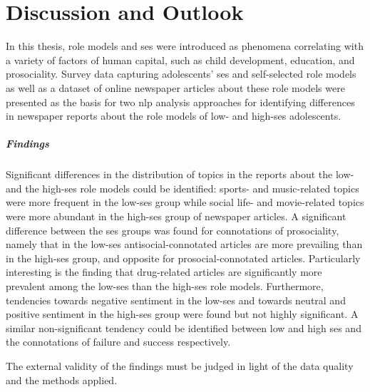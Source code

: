\renewcommand{\imagepath}{../80-outro/img}

\chapter{Discussion and Outlook}
In this thesis, role models and \gls{ses} were introduced as phenomena correlating with a variety of factors of human capital, such as child development, education, and prosociality. Survey data capturing adolescents' \gls{ses} and self-selected role models as well as a dataset of online newspaper articles about these role models were presented as the basis for two \gls{nlp} analysis approaches for identifying differences in newspaper reports about the role models of low- and high-\gls{ses} adolescents.

\paragraph{Findings}
Significant differences in the distribution of topics in the reports about the low- and the high-\gls{ses} role models could be identified: sports- and music-related topics were more frequent in the low-\gls{ses} group while social life- and movie-related topics were more abundant in the high-\gls{ses} group of newspaper articles. A significant difference between the \gls{ses} groups was found for connotations of prosociality, namely that in the low-\gls{ses} antisocial-connotated articles are more prevailing than in the high-\gls{ses} group, and opposite for prosocial-connotated articles. Particularly interesting is the finding that drug-related articles are significantly more prevalent among the low-\gls{ses} than the high-\gls{ses} role models. Furthermore, tendencies towards negative sentiment in the low-\gls{ses} and towards neutral and positive sentiment in the high-\gls{ses} group were found but not highly significant. A similar non-significant tendency could be identified between low and high \gls{ses} and the connotations of failure and success respectively.

The external validity of the findings must be judged in light of the data quality and the methods applied. 

